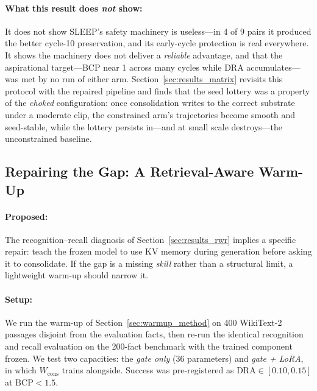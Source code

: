 \paragraph{What this result does \emph{not} show:} It does not show SLEEP's safety machinery is useless---in 4 of 9 pairs it produced the better cycle-10 preservation, and its early-cycle protection is real everywhere. It shows the machinery does not deliver a \emph{reliable} advantage, and that the aspirational target---BCP near 1 across many cycles while DRA accumulates---was met by no run of either arm. Section~\ref{sec:results_matrix} revisits this protocol with the repaired pipeline and finds that the seed lottery was a property of the \emph{choked} configuration: once consolidation writes to the correct substrate under a moderate clip, the constrained arm's trajectories become smooth and seed-stable, while the lottery persists in---and at small scale destroys---the unconstrained baseline.

\subsection{Repairing the Gap: A Retrieval-Aware Warm-Up}
\label{sec:results_warmup}

\paragraph{Proposed:} The recognition--recall diagnosis of Section~\ref{sec:results_rwr} implies a specific repair: teach the frozen model to use KV memory during generation before asking it to consolidate. If the gap is a missing \emph{skill} rather than a structural limit, a lightweight warm-up should narrow it.

\paragraph{Setup:} We run the warm-up of Section~\ref{sec:warmup_method} on 400 WikiText-2 passages disjoint from the evaluation facts, then re-run the identical recognition and recall evaluation on the 200-fact benchmark with the trained component frozen. We test two capacities: the \emph{gate only} ($36$ parameters) and \emph{gate + LoRA}, in which $W_{\mathrm{cons}}$ trains alongside. Success was pre-registered as $\mathrm{DRA} \in [0.10, 0.15]$ at $\mathrm{BCP} < 1.5$.

